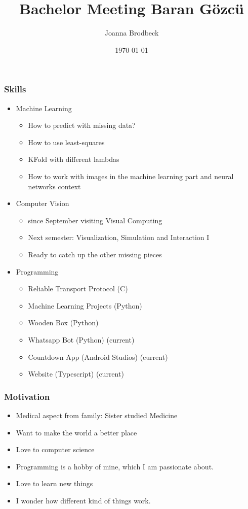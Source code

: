 \documentclass{article}
\title{Bachelor Meeting Baran Gözcü}
\author{Joanna Brodbeck}
\date{\today}
\begin{document}
\maketitle


\subsubsection*{Skills}
\begin{itemize}
    \item Machine Learning
    \begin{itemize}
        \item How to predict with missing data?
        \item How to use least-squares
        \item KFold with different lambdas
        \item How to work with images in the machine learning part and neural networks context
    \end{itemize}
    \item Computer Vision
    \begin{itemize}
        \item since September visiting Visual Computing
        \item Next semester: Visualization, Simulation and Interaction I
        \item Ready to catch up the other missing pieces
    \end{itemize}
    \item Programming
    \begin{itemize}
        \item Reliable Transport Protocol (C)
        \item Machine Learning Projects (Python)
        \item Wooden Box (Python)
        \item Whatsapp Bot (Python) (current)
        \item Countdown App (Android Studios) (current)
        \item Website (Typescript) (current)
    \end{itemize}
\end{itemize}

\subsubsection*{Motivation}
\begin{itemize}
    \item Medical aspect from family: Sister studied Medicine
    \item Want to make the world a better place
    \item Love to computer science
    \item Programming is a hobby of mine, which I am passionate about.
    \item Love to learn new things
    \item I wonder how different kind of things work.
\end{itemize}
\end{document}
